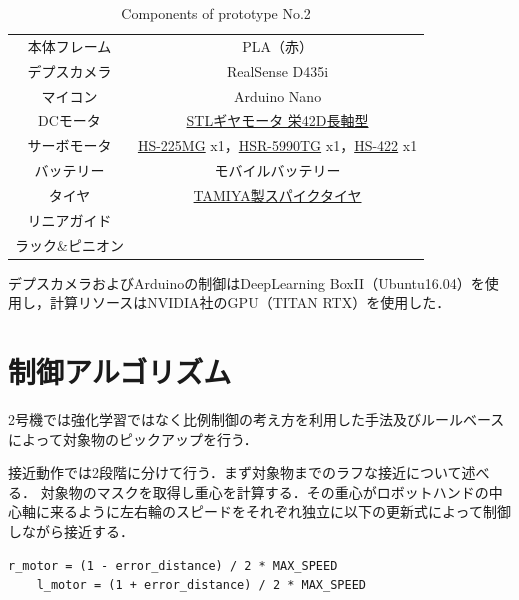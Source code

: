 \begin{table}[H]
    \centering
    \caption{Components of prototype No.2}
    \begin{tabular}{cc}\toprule
        本体フレーム & PLA（赤） \\
        デプスカメラ & RealSense D435i \\ 
        マイコン & Arduino Nano \\ 
        DCモータ & \href{http://akizukidenshi.com/catalog/g/gM-12379/}{STLギヤモータ 栄42D長軸型} \\ 
        サーボモータ & \href{https://hitecrcd.co.jp/products/servo32225/}{HS-225MG} x1，\href{https://hitecrcd.com/products/servos/discontinued-servos-servo-accessories/hsr-5990tg-hmi-ultra-premium-robot-servo/product}{HSR-5990TG} x1，\href{https://hitecrcd.co.jp/products/servo31422s/}{HS-422} x1 \\ 
        バッテリー & モバイルバッテリー \\ 
        タイヤ & \href{https://tamiya.com/japan/products/70194/index.html}{TAMIYA製スパイクタイヤ} \\
        リニアガイド &  \\
        ラック\&ピニオン &  \\ \bottomrule
    \end{tabular} 
    \label{tab:2号機部品}
\end{table}

デプスカメラおよびArduinoの制御はDeepLearning BoxII（Ubuntu16.04）を使用し，計算リソースはNVIDIA社のGPU（TITAN RTX）を使用した．




\section{制御アルゴリズム}
2号機では強化学習ではなく比例制御の考え方を利用した手法及びルールベースによって対象物のピックアップを行う．

接近動作では2段階に分けて行う．まず対象物までのラフな接近について述べる．
対象物のマスクを取得し重心を計算する．その重心がロボットハンドの中心軸に来るように左右輪のスピードをそれぞれ独立に以下の更新式によって制御しながら接近する．

\begin{lstlisting}[caption=接近アルゴリズム, label=code:motor]
    r_motor = (1 - error_distance) / 2 * MAX_SPEED
    l_motor = (1 + error_distance) / 2 * MAX_SPEED
\end{lstlisting}

